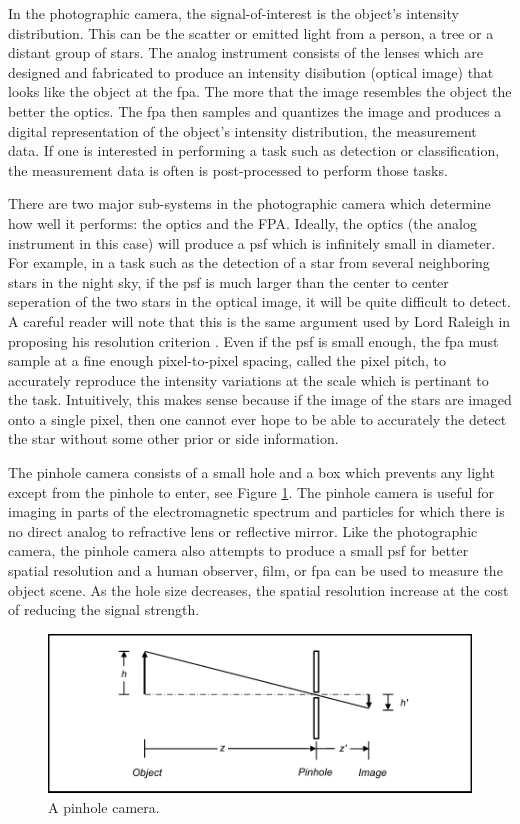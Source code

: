 In the photographic camera, the signal-of-interest is the object's intensity distribution. This can be the scatter or emitted light from a person, a tree or a distant group of stars. The analog instrument consists of the lenses which are designed and fabricated to produce an intensity disibution (optical image) that looks like the object at the \gls{fpa}. The more that the image resembles the object the better the optics. The \gls{fpa} then samples and quantizes the image and produces a digital representation of the object's intensity distribution, the measurement data. If one is interested in performing a task such as detection or classification, the measurement data is often is post-processed to perform those tasks. 


There are two major sub-systems in the photographic camera which determine how well it performs: the optics and the FPA. Ideally, the optics (the analog instrument in this case) will produce a \gls{psf} which is infinitely small in diameter. For example, in a task such as the detection of a star from several neighboring stars in the night sky, if the \gls{psf} is much larger than the center to center seperation of the two stars in the optical image, it will be quite difficult to detect. A careful reader will note that this is the same argument used by Lord Raleigh in proposing his resolution criterion \cite{rayleigh1879investigations}. Even if the \gls{psf} is small enough, the \gls{fpa} must sample at a fine enough pixel-to-pixel spacing, called the \gls{pixel pitch}, to accurately reproduce the intensity variations at the scale which is pertinant to the task. Intuitively, this makes sense because if the image of the stars are imaged onto a single pixel, then one cannot ever hope to be able to accurately the detect the star without some other prior or side information. 

The pinhole camera consists of a small hole and a box which prevents any light except from the pinhole to enter, see Figure \ref{fig:pinholecamera}. The pinhole camera is useful for imaging in parts of the electromagnetic spectrum and particles for which there is no direct analog to refractive lens or reflective mirror. Like the photographic camera, the pinhole camera also attempts to produce a small \gls{psf} for better spatial resolution and a human observer, film, or \gls{fpa} can be used to measure the object scene. As the hole size decreases, the spatial resolution increase at the cost of reducing the signal strength.

\begin{figure}
    \centering
    \includegraphics[scale=1]{pinholecamera}
    \caption{A pinhole camera.}
    \label{fig:pinholecamera}
\end{figure}

